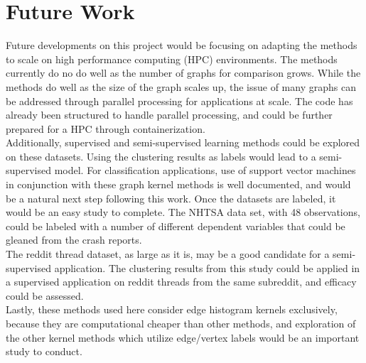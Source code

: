 %
%
%

\chapter{Future Work}

Future developments on this project would be focusing on adapting the methods to scale on high performance computing (HPC) environments. The methods currently do no do well as the number of graphs for comparison grows. While the methods do well as the size of the graph scales up, the issue of many graphs can be addressed through parallel processing for applications at scale. The code has already been structured to handle parallel processing, and could be further prepared for a HPC through containerization.\\

Additionally, supervised and semi-supervised learning methods could be explored on these datasets. Using the clustering results as labels would lead to a semi-supervised model. For classification applications, use of support vector machines in conjunction with these graph kernel methods is well documented, and would be a natural next step following this work. Once the datasets are labeled, it would be an easy study to complete. The NHTSA data set, with 48 observations, could be labeled with a number of different dependent variables that could be gleaned from the crash reports.\\

The reddit thread dataset, as large as it is, may be a good candidate for a semi-supervised application. The clustering results from this study could be applied in a supervised application on reddit threads from the same subreddit, and efficacy could be assessed.\\

Lastly, these methods used here consider edge histogram kernels exclusively, because they are computational cheaper than other methods, and exploration of the other kernel methods which utilize edge/vertex labels would be an important study to conduct. 
